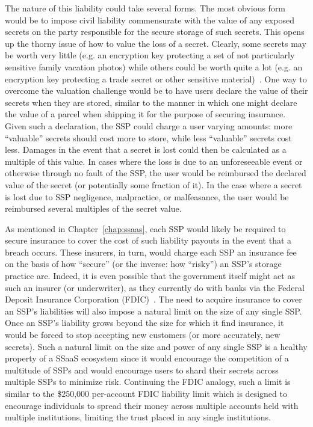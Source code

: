 The nature of this liability could take several forms. The most
obvious form would be to impose civil liability commensurate with the
value of any exposed secrets on the party responsible for the secure
storage of such secrets. This opens up the thorny issue of how to
value the loss of a secret. Clearly, some secrets may be worth very
little (e.g. an encryption key protecting a set of not particularly
sensitive family vacation photos) while others could be worth quite a
lot (e.g. an encryption key protecting a trade secret or other
sensitive material)~\cite{acquisti2013}. One way to overcome the
valuation challenge would be to have users declare the value of their
secrets when they are stored, similar to the manner in which one might
declare the value of a parcel when shipping it for the purpose of
securing insurance. Given such a declaration, the SSP could charge a
user varying amounts: more ``valuable'' secrets should cost more to
store, while less ``valuable'' secrets cost less. Damages in the event
that a secret is lost could then be calculated as a multiple of this
value. In cases where the loss is due to an unforeseeable event or
otherwise through no fault of the SSP, the user would be reimbursed
the declared value of the secret (or potentially some fraction of
it). In the case where a secret is lost due to SSP negligence,
malpractice, or malfeasance, the user would be reimbursed several
multiples of the secret value.

As mentioned in Chapter~\ref{chap:ssaas}, each SSP would likely be
required to secure insurance to cover the cost of such liability
payouts in the event that a breach occurs. These insurers, in turn,
would charge each SSP an insurance fee on the basis of how ``secure''
(or the inverse: how ``risky'') an SSP's storage practice are. Indeed,
it is even possible that the government itself might act as such an
insurer (or underwriter), as they currently do with banks via the
Federal Deposit Insurance Corporation (FDIC)~\cite{fdic}. The need to
acquire insurance to cover an SSP's liabilities will also impose a
natural limit on the size of any single SSP. Once an SSP's liability
grows beyond the size for which it find insurance, it would be forced
to stop accepting new customers (or more accurately, new
secrets). Such a natural limit on the size and power of any single SSP
is a healthy property of a SSaaS ecosystem since it would encourage
the competition of a multitude of SSPs and would encourage users to
shard their secrets across multiple SSPs to minimize risk. Continuing
the FDIC analogy, such a limit is similar to the \$250,000 per-account
FDIC liability limit which is designed to encourage individuals to
spread their money across multiple accounts held with multiple
institutions, limiting the trust placed in any single institutions.

